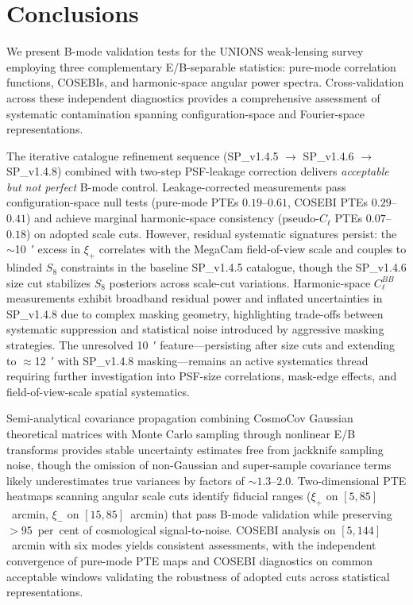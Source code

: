 \documentclass{aa}
\begin{document}
\section{Conclusions}

We present B-mode validation tests for the UNIONS weak-lensing survey employing three complementary E/B-separable statistics: pure-mode correlation functions, COSEBIs, and harmonic-space angular power spectra. Cross-validation across these independent diagnostics provides a comprehensive assessment of systematic contamination spanning configuration-space and Fourier-space representations.

The iterative catalogue refinement sequence (SP\_v1.4.5 $\to$ SP\_v1.4.6 $\to$ SP\_v1.4.8) combined with two-step PSF-leakage correction delivers \emph{acceptable but not perfect} B-mode control. Leakage-corrected measurements pass configuration-space null tests (pure-mode PTEs $0.19$--$0.61$, COSEBI PTEs $0.29$--$0.41$) and achieve marginal harmonic-space consistency (pseudo-$C_\ell$ PTEs $0.07$--$0.18$) on adopted scale cuts. However, residual systematic signatures persist: the $\sim$\SI{10}{\arcmin} excess in $\xi_+$ correlates with the MegaCam field-of-view scale and couples to blinded $S_8$ constraints in the baseline SP\_v1.4.5 catalogue, though the SP\_v1.4.6 size cut stabilizes $S_8$ posteriors across scale-cut variations. Harmonic-space $C_\ell^{BB}$ measurements exhibit broadband residual power and inflated uncertainties in SP\_v1.4.8 due to complex masking geometry, highlighting trade-offs between systematic suppression and statistical noise introduced by aggressive masking strategies. The unresolved \SI{10}{\arcmin} feature—persisting after size cuts and extending to $\approx$\SI{12}{\arcmin} with SP\_v1.4.8 masking—remains an active systematics thread requiring further investigation into PSF-size correlations, mask-edge effects, and field-of-view-scale spatial systematics.

Semi-analytical covariance propagation combining CosmoCov Gaussian theoretical matrices with Monte Carlo sampling through nonlinear E/B transforms provides stable uncertainty estimates free from jackknife sampling noise, though the omission of non-Gaussian and super-sample covariance terms likely underestimates true variances by factors of $\sim 1.3$--$2.0$. Two-dimensional PTE heatmaps scanning angular scale cuts identify fiducial ranges ($\xi_+$ on $[5, 85]$~arcmin, $\xi_-$ on $[15, 85]$~arcmin) that pass B-mode validation while preserving $> 95$~per~cent of cosmological signal-to-noise. COSEBI analysis on $[5, 144]$~arcmin with six modes yields consistent assessments, with the independent convergence of pure-mode PTE maps and COSEBI diagnostics on common acceptable windows validating the robustness of adopted cuts across statistical representations.
\end{document}
